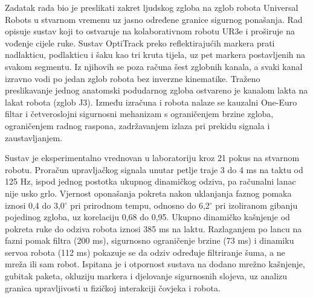 Zadatak rada bio je preslikati zakret ljudskog zgloba na zglob robota Universal Robots u stvarnom vremenu uz jasno određene granice sigurnog ponašanja. Rad opisuje sustav koji to ostvaruje na kolaborativnom robotu UR3e i proširuje na vođenje cijele ruke. Sustav OptiTrack preko reflektirajućih markera prati nadlakticu, podlakticu i šaku kao tri kruta tijela, uz pet markera postavljenih na svakom segmentu. Iz njihovih se poza računa šest zglobnih kanala, a svaki kanal izravno vodi po jedan zglob robota bez inverzne kinematike. Traženo preslikavanje jednog anatomski podudarnog zgloba ostvareno je kanalom lakta na lakat robota (zglob J3). Između izračuna i robota nalaze se kauzalni One-Euro filtar i četveroslojni sigurnosni mehanizam s ograničenjem brzine zgloba, ograničenjem radnog raspona, zadržavanjem izlaza pri prekidu signala i zaustavljanjem.

Sustav je eksperimentalno vrednovan u laboratoriju kroz 21 pokus na stvarnom robotu. Proračun upravljačkog signala unutar petlje traje 3 do 4 ms na taktu od 125 Hz, ispod jednog postotka ukupnog dinamičkog odziva, pa računalni lanac nije usko grlo. Vjernost oponašanja pokreta nakon uklanjanja faznog pomaka iznosi 0,4 do 3,0$^\circ$ pri prirodnom tempu, odnosno do 6,2$^\circ$ pri izoliranom gibanju pojedinog zgloba, uz korelaciju 0,68 do 0,95. Ukupno dinamičko kašnjenje od pokreta ruke do odziva robota iznosi 385 ms na laktu. Razlaganjem po lancu na fazni pomak filtra (200 ms), sigurnosno ograničenje brzine (73 ms) i dinamiku servoa robota (112 ms) pokazuje se da odziv određuje filtriranje šuma, a ne mreža ili sam robot. Ispitana je i otpornost sustava na dodano mrežno kašnjenje, gubitak paketa, okluziju markera i djelovanje sigurnosnih slojeva, uz analizu granica upravljivosti u fizičkoj interakciji čovjeka i robota.
